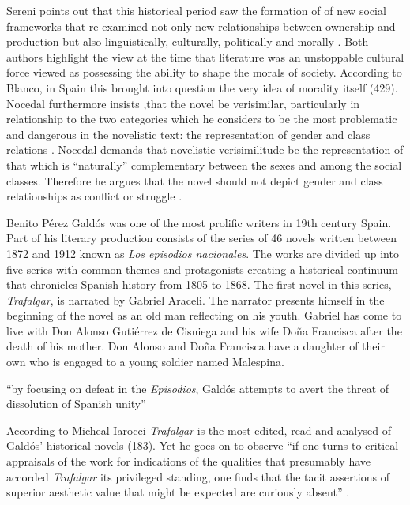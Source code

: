 \documentclass[12pt]{report}
\begin{document}
Sereni points out that this historical period saw the formation of of new social frameworks that re-examined not only new relationships between ownership and production but also linguistically, culturally, politically and morally \cite[Sereni in][429]{Blanco2000}.
Both authors highlight the view at the time that literature was an unstoppable cultural force viewed as possessing the ability to shape the morals of society. 
According to Blanco, in Spain this brought into question the very idea of morality itself (429)\nocite{Blanco2000}.
Nocedal furthermore insists ,that the novel be verisimilar, particularly in relationship to the two categories which he considers to be the most
problematic and dangerous in the novelistic text: the representation of gender and class relations \cite[430]{Blanco2000}.
Nocedal demands that novelistic verisimilitude be the representation of that which is “naturally” complementary between the sexes and among the social classes. 
Therefore he argues that the novel should not depict gender and class relationships as conflict or struggle \cite[430]{Blanco2000}.

Benito Pérez Galdós was one of the most prolific writers in 19th century Spain. 
Part of his literary production consists of the series of 46 novels written between 1872 and 1912 known as \textit{Los episodios nacionales}.
The works are divided up into five series with common themes and protagonists creating a historical continuum that chronicles Spanish history from 1805 to 1868.
The first novel in this series, \textit{Trafalgar}, is narrated by Gabriel Araceli.
The narrator presents himself in the beginning of the novel as an old man reflecting on his youth.
Gabriel has come to live with Don Alonso Gutiérrez de Cisniega and his wife Doña Francisca after the death of his mother.
Don Alonso and Doña Francisca have a daughter of their own who is engaged to a young soldier named Malespina.

\enquote{by focusing on defeat in the \textit{Episodios}, Galdós attempts to avert the threat of dissolution of Spanish unity} \cite[12]{Kempen2007}

According to Micheal Iarocci \textit{Trafalgar} is the most edited, read and analysed of Galdós' historical novels (183)\nocite{Iarocci2003}.
Yet he goes on to observe \enquote{if one turns to critical appraisals of the work for indications of the qualities that presumably have accorded \textit{Trafalgar} its privileged standing, one finds that the tacit assertions of superior aesthetic value that might be expected are curiously absent} \cite[183]{Iarocci2003}.
\end{document}
